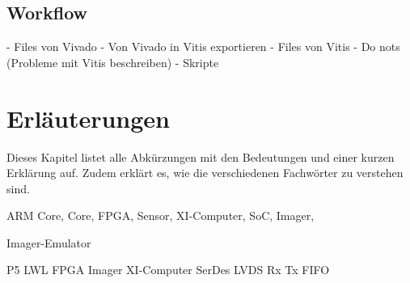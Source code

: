 \documentclass{article}
\begin{document}
\subsection{Workflow}
- Files von Vivado
- Von Vivado in Vitis exportieren
- Files von Vitis
- Do nots (Probleme mit Vitis beschreiben)
- Skripte


\section{Erläuterungen}
Dieses Kapitel listet alle Abkürzungen mit den Bedeutungen und einer kurzen Erklärung auf. Zudem erklärt es, wie die verschiedenen Fachwörter zu verstehen sind.

ARM Core,
Core,
FPGA,
Sensor,
XI-Computer,
SoC,
Imager,

Imager-Emulator

P5
LWL
FPGA
Imager
XI-Computer
SerDes
LVDS
Rx
Tx
FIFO
\end{document}
